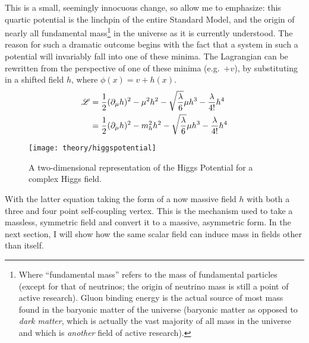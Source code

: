     This is a small, seemingly innocuous change, so allow me to emphasize:
        this quartic potential is the linchpin of the entire Standard Model,
        and the origin of nearly all fundamental mass\footnote{
            Where ``fundamental mass'' refers to the mass of fundamental particles
                (except for that of neutrinos; the origin of neutrino mass is still a point of active research).
            Gluon binding energy is the actual source of most mass found in the baryonic matter of the universe
                (baryonic matter as opposed to \textit{dark matter},
                which is actually the vast majority of all mass in the universe
                and which is \textit{another} field of active research).
        } in the universe as it is currently understood.
    The reason for such a dramatic outcome begins with the fact that
        a system in such a potential will invariably fall into one of these minima.
    The Lagrangian can be rewritten from the perspective of one of these minima (e.g.\ $+v$),
        by substituting in a shifted field $h$, where $\phi(x)=v+h(x)$.
    \begin{equation} \begin{split} \label{eq:basic_higgs}
        \mathscr{L} & = \frac{1}{2} (\partial_{\mu} h)^2
            - \mu^2 h^2
            -\sqrt{\frac{\lambda}{6}} \mu h^3
            - \frac{\lambda}{4!} h^4 \\
         & = \frac{1}{2} (\partial_{\mu} h)^2
            - m^2_{h} h^2
            -\sqrt{\frac{\lambda}{6}} \mu h^3
            - \frac{\lambda}{4!} h^4 \\
    \end{split} \end{equation} %

    \begin{figure}[h!]
        \texttt{[image: theory/higgspotential]}
        \caption{A two-dimensional representation of the Higgs Potential for a complex Higgs field.
            \cite{higgspotential}}
        \label{fig:higgs_potential}
    \end{figure}


    With the latter equation taking the form of a now massive field $h$ with both a three and four point self-coupling vertex.
    This is the mechanism used to take a massless, symmetric field and convert it to a massive, asymmetric form.
    In the next section, I will show how the same scalar field can induce mass in fields other than itself.


